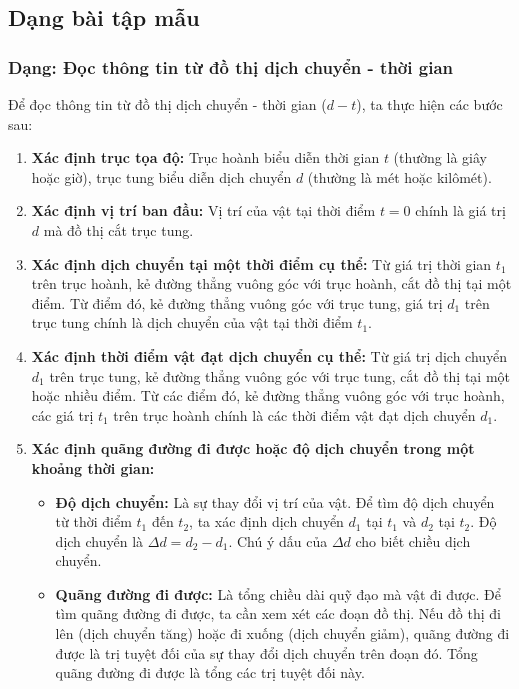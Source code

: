 

\subsection{Dạng bài tập mẫu}

\subsubsection{Dạng: Đọc thông tin từ đồ thị dịch chuyển - thời gian}
\begin{phuongphap}
Để đọc thông tin từ đồ thị dịch chuyển - thời gian ($d-t$), ta thực hiện các bước sau:
\begin{enumerate}
    \item \textbf{Xác định trục tọa độ:} Trục hoành biểu diễn thời gian $t$ (thường là giây hoặc giờ), trục tung biểu diễn dịch chuyển $d$ (thường là mét hoặc kilômét).
    \item \textbf{Xác định vị trí ban đầu:} Vị trí của vật tại thời điểm $t=0$ chính là giá trị $d$ mà đồ thị cắt trục tung.
    \item \textbf{Xác định dịch chuyển tại một thời điểm cụ thể:} Từ giá trị thời gian $t_1$ trên trục hoành, kẻ đường thẳng vuông góc với trục hoành, cắt đồ thị tại một điểm. Từ điểm đó, kẻ đường thẳng vuông góc với trục tung, giá trị $d_1$ trên trục tung chính là dịch chuyển của vật tại thời điểm $t_1$.
    \item \textbf{Xác định thời điểm vật đạt dịch chuyển cụ thể:} Từ giá trị dịch chuyển $d_1$ trên trục tung, kẻ đường thẳng vuông góc với trục tung, cắt đồ thị tại một hoặc nhiều điểm. Từ các điểm đó, kẻ đường thẳng vuông góc với trục hoành, các giá trị $t_1$ trên trục hoành chính là các thời điểm vật đạt dịch chuyển $d_1$.
    \item \textbf{Xác định quãng đường đi được hoặc độ dịch chuyển trong một khoảng thời gian:}
    \begin{itemize}
        \item \textbf{Độ dịch chuyển:} Là sự thay đổi vị trí của vật. Để tìm độ dịch chuyển từ thời điểm $t_1$ đến $t_2$, ta xác định dịch chuyển $d_1$ tại $t_1$ và $d_2$ tại $t_2$. Độ dịch chuyển là $\Delta d = d_2 - d_1$. Chú ý dấu của $\Delta d$ cho biết chiều dịch chuyển.
        \item \textbf{Quãng đường đi được:} Là tổng chiều dài quỹ đạo mà vật đi được. Để tìm quãng đường đi được, ta cần xem xét các đoạn đồ thị. Nếu đồ thị đi lên (dịch chuyển tăng) hoặc đi xuống (dịch chuyển giảm), quãng đường đi được là trị tuyệt đối của sự thay đổi dịch chuyển trên đoạn đó. Tổng quãng đường đi được là tổng các trị tuyệt đối này.

\end{itemize}
\end{enumerate}
\end{phuongphap}
